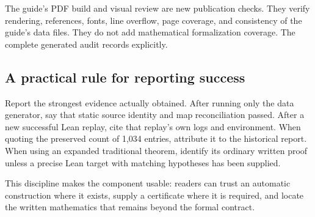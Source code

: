 The guide's PDF build and visual review are new publication checks. They verify rendering, references, fonts, line overflow, page coverage, and consistency of the guide's data files. They do not add mathematical formalization coverage. The complete generated audit records  explicitly.

\subsection{A practical rule for reporting success}

Report the strongest evidence actually obtained. After running only the data generator, say that static source identity and map reconciliation passed. After a new successful Lean replay, cite that replay's own logs and environment. When quoting the preserved count of 1,034 entries, attribute it to the historical report. When using an expanded traditional theorem, identify its ordinary written proof unless a precise Lean target with matching hypotheses has been supplied.

This discipline makes the component usable: readers can trust an automatic construction where it exists, supply a certificate where it is required, and locate the written mathematics that remains beyond the formal contract.
